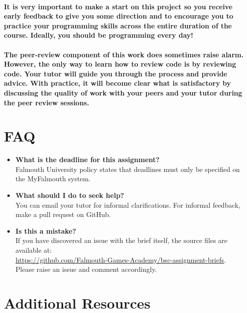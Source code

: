 \documentclass{../../fal_assignment}
\begin{document}
\paragraph{It is very important to make a start on this project so you receive early feedback to give you some direction and to encourage you to practice your programming skills across the entire duration of the course. Ideally, you should be programming every day!}

\paragraph{The peer-review component of this work does sometimes raise alarm. However, the only way to learn how to review code is by reviewing code. Your tutor will guide you through the process and provide advice. With practice, it will become clear what is satisfactory by discussing the quality of work with your peers and your tutor during the peer review sessions.} 

\section*{FAQ}

\begin{itemize}
	\item 	\textbf{What is the deadline for this assignment?} \\ 
    		Falmouth University policy states that deadlines must only be specified on the MyFalmouth system.
    		
	\item 	\textbf{What should I do to seek help?} \\ 
    		You can email your tutor for informal clarifications. For informal feedback, make a pull request on GitHub. 
    		
    	\item 	\textbf{Is this a mistake?} \\ 	
    		If you have discovered an issue with the brief itself, the source files are available at: \\
    		\url{https://github.com/Falmouth-Games-Academy/bsc-assignment-briefs}.\\
    		 Please raise an issue and comment accordingly.
\end{itemize}

\section*{Additional Resources}
\end{document}
